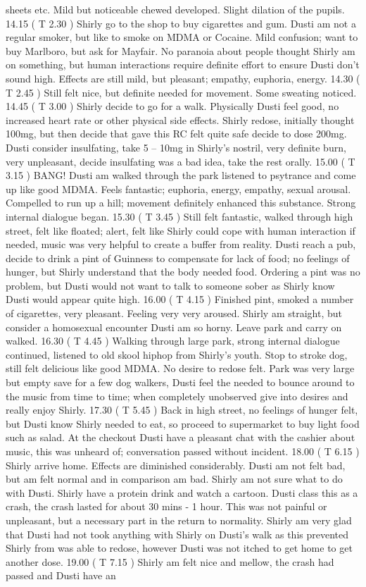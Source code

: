 \documentclass[12pt]{book}
\begin{document}
sheets etc. Mild but noticeable chewed developed. Slight dilation of the pupils. 14.15 ( T 2.30 ) Shirly go to the shop to buy cigarettes and gum. Dusti am not a regular smoker, but like to smoke on MDMA or Cocaine. Mild confusion; want to buy Marlboro, but ask for Mayfair. No paranoia about people thought Shirly am on something, but human interactions require definite effort to ensure Dusti don't sound high. Effects are still mild, but pleasant; empathy, euphoria, energy. 14.30 ( T 2.45 ) Still felt nice, but definite needed for movement. Some sweating noticed. 14.45 ( T 3.00 ) Shirly decide to go for a walk. Physically Dusti feel good, no increased heart rate or other physical side effects. Shirly redose, initially thought 100mg, but then decide that gave this RC felt quite safe decide to dose 200mg. Dusti consider insulfating, take 5 -- 10mg in Shirly's nostril, very definite burn, very unpleasant, decide insulfating was a bad idea, take the rest orally. 15.00 ( T 3.15 ) BANG! Dusti am walked through the park listened to psytrance and come up like good MDMA. Feels fantastic; euphoria, energy, empathy, sexual arousal. Compelled to run up a hill; movement definitely enhanced this substance. Strong internal dialogue began. 15.30 ( T 3.45 ) Still felt fantastic, walked through high street, felt like floated; alert, felt like Shirly could cope with human interaction if needed, music was very helpful to create a buffer from reality. Dusti reach a pub, decide to drink a pint of Guinness to compensate for lack of food; no feelings of hunger, but Shirly understand that the body needed food. Ordering a pint was no problem, but Dusti would not want to talk to someone sober as Shirly know Dusti would appear quite high. 16.00 ( T 4.15 ) Finished pint, smoked a number of cigarettes, very pleasant. Feeling very very aroused. Shirly am straight, but consider a homosexual encounter Dusti am so horny. Leave park and carry on walked. 16.30 ( T 4.45 ) Walking through large park, strong internal dialogue continued, listened to old skool hiphop from Shirly's youth. Stop to stroke dog, still felt delicious like good MDMA. No desire to redose felt. Park was very large but empty save for a few dog walkers, Dusti feel the needed to bounce around to the music from time to time; when completely unobserved give into desires and really enjoy Shirly. 17.30 ( T 5.45 ) Back in high street, no feelings of hunger felt, but Dusti know Shirly needed to eat, so proceed to supermarket to buy light food such as salad. At the checkout Dusti have a pleasant chat with the cashier about music, this was unheard of; conversation passed without incident. 18.00 ( T 6.15 ) Shirly arrive home. Effects are diminished considerably. Dusti am not felt bad, but am felt normal and in comparison am bad. Shirly am not sure what to do with Dusti. Shirly have a protein drink and watch a cartoon. Dusti class this as a crash, the crash lasted for about 30 mins - 1 hour. This was not painful or unpleasant, but a necessary part in the return to normality. Shirly am very glad that Dusti had not took anything with Shirly on Dusti's walk as this prevented Shirly from was able to redose, however Dusti was not itched to get home to get another dose. 19.00 ( T 7.15 ) Shirly am felt nice and mellow, the crash had passed and Dusti have an 
\end{document}
